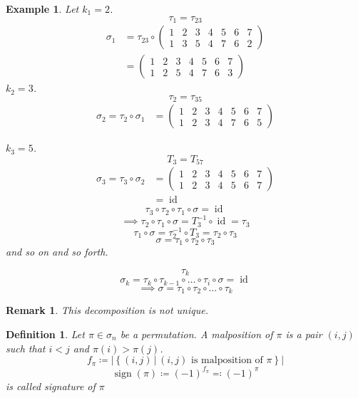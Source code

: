 \documentclass{article}
\newtheorem{example}{Example}  \numberwithin{example}{section}
\newtheorem{definition}{Definition}  \numberwithin{definition}{section}
\newtheorem{remark}{Remark}  \numberwithin{remark}{section}
\newcommand{\setdef}[2]{\left\{\left.#1\,\right|\,#2\right\}}
\newcommand{\card}[1]{\left|#1\right|}
\DeclareMathOperator{\sign}{sign}
\begin{document}
\begin{example}
  Let $k_1 = 2$.
  \[ \tau_1 = \tau_{23} \]
  \begin{align*}
    \sigma_1 &= \tau_{23} \circ \begin{pmatrix} 1 & 2 & 3 & 4 & 5 & 6 & 7 \\ 1 & 3 & 5 & 4 & 7 & 6 & 2 \end{pmatrix} \\
      &= \begin{pmatrix} 1 & 2 & 3 & 4 & 5 & 6 & 7 \\ 1 & 2 & 5 & 4 & 7 & 6 & 3 \end{pmatrix}
  \end{align*}
  $k_2 = 3$.
  \[ \tau_2 = \tau_{35} \]
  \begin{align*}
    \sigma_2 = \tau_2 \circ \sigma_1 &= \begin{pmatrix} 1 & 2 & 3 & 4 & 5 & 6 & 7 \\ 1 & 2 & 3 & 4 & 7 & 6 & 5 \end{pmatrix}
  \end{align*}

  $k_3 = 5$.
  \[ T_3 = T_{57} \]
  \begin{align*}
    \sigma_3 = \tau_3 \circ \sigma_2 &= \begin{pmatrix} 1 & 2 & 3 & 4 & 5 & 6 & 7 \\ 1 & 2 & 3 & 4 & 5 & 6 & 7 \end{pmatrix} \\
      &= \operatorname{id}
  \end{align*}
  \[ \tau_3 \circ \tau_2 \circ \tau_1 \circ \sigma = \operatorname{id} \]
  \[ \implies \tau_2 \circ \tau_1 \circ \sigma = T_3^{-1} \circ \operatorname{id} = \tau_3 \]
  \[ \tau_1 \circ \sigma = \tau_2^{-1} \circ T_3 = \tau_2 \circ \tau_3 \]
  \[ \sigma = \tau_1 \circ \tau_2 \circ \tau_3 \]
  and so on and so forth.

  \[ \tau_k \]
  \[ \sigma_k = \tau_k \circ \tau_{k-1} \circ \dots \circ \tau_{i} \circ \sigma = \operatorname{id} \]
  \[ \implies \sigma = \tau_1 \circ \tau_2 \circ \dots \circ \tau_k \]
\end{example}

\begin{remark}
  This decomposition is not unique.
\end{remark}

\begin{definition} %
  Let $\pi \in \sigma_n$ be a permutation. %
  A \emph{malposition} of $\pi$ is a pair $(i,j)$ such that $i < j$ and $\pi(i) > \pi(j)$.
  \[ f_\pi \coloneqq \card{\setdef{(i,j)}{(i,j) \text{ is malposition of } \pi}} \]
  \[ \sign(\pi) \coloneqq (-1)^{f_\pi} \eqqcolon (-1)^\pi \]
  is called \emph{signature of $\pi$}
\end{definition}
\end{document}
